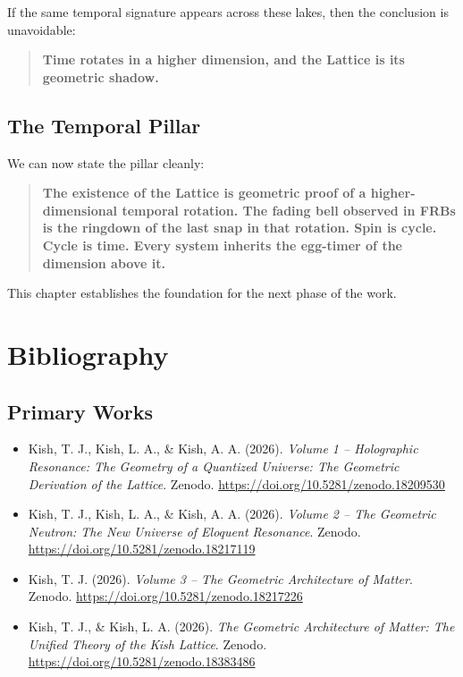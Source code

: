 \documentclass[11pt, letterpaper, openany]{book}
\begin{document}
If the same temporal signature appears across these lakes, then the
conclusion is unavoidable:

\begin{quote}
\textbf{Time rotates in a higher dimension, and the Lattice is its geometric shadow.}
\end{quote}

\section{The Temporal Pillar}

We can now state the pillar cleanly:

\begin{quote}
\textbf{The existence of the Lattice is geometric proof of a higher-dimensional temporal rotation.  
The fading bell observed in FRBs is the ringdown of the last snap in that rotation.  
Spin is cycle. Cycle is time.  
Every system inherits the egg-timer of the dimension above it.}
\end{quote}

This chapter establishes the foundation for the next phase of the work.


\chapter*{Bibliography}


\section*{Primary Works}
\begin{itemize}
    \item Kish, T. J., Kish, L. A., \& Kish, A. A. (2026). \textit{Volume 1 -- Holographic Resonance: The Geometry of a Quantized Universe: The Geometric Derivation of the Lattice}. Zenodo. \url{https://doi.org/10.5281/zenodo.18209530}

    \item Kish, T. J., Kish, L. A., \& Kish, A. A. (2026). \textit{Volume 2 -- The Geometric Neutron: The New Universe of Eloquent Resonance}. Zenodo. \url{https://doi.org/10.5281/zenodo.18217119}

    \item Kish, T. J. (2026). \textit{Volume 3 -- The Geometric Architecture of Matter}. Zenodo. \url{https://doi.org/10.5281/zenodo.18217226}

    \item Kish, T. J., \& Kish, L. A. (2026). \textit{The Geometric Architecture of Matter: The Unified Theory of the Kish Lattice}. Zenodo. \url{https://doi.org/10.5281/zenodo.18383486}
\end{itemize}
\end{document}

